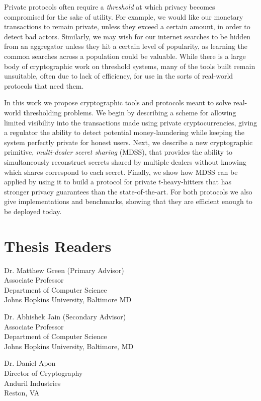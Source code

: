 
Private protocols often require a \emph{threshold} at which privacy becomes compromised for the sake of utility.
For example, we would like our monetary transactions to remain private, unless they exceed a certain amount, in order to detect bad actors.
Similarly, we may wish for our internet searches to be hidden from an aggregator unless they hit a certain level of popularity, as learning the common searches across a population could be valuable.
While there is a large body of cryptographic work on threshold systems, many of the tools built remain unsuitable, often due to lack of efficiency, for use in the sorts of real-world protocols that need them.

In this work we propose cryptographic tools and protocols meant to solve real-world thresholding problems.
We begin by describing a scheme for allowing limited visibility into the transactions made using private cryptocurrencies, giving a regulator the ability to detect potential money-laundering while keeping the system perfectly private for honest users.
Next, we describe a new cryptographic primitive, \emph{multi-dealer secret sharing} (MDSS), that provides the ability to simultaneously reconstruct secrets shared by multiple dealers without knowing which shares correspond to each secret.
Finally, we show how MDSS can be applied by using it to build a protocol for private $t$-heavy-hitters that has stronger privacy guarantees than the state-of-the-art.
For both protocols we also give implementations and benchmarks, showing that they are efficient enough to be deployed today.



\section*{Thesis Readers}

\begin{singlespace}

	Dr. Matthew Green (Primary Advisor)\\
	Associate Professor\\
	Department of Computer Science\\
	Johns Hopkins University, Baltimore MD

	\vspace{0.1in}

	Dr. Abhishek Jain (Secondary Advisor)\\
	Associate Professor\\
	Department of Computer Science \\
	Johns Hopkins University, Baltimore, MD

	\vspace{0.1in}

	Dr. Daniel Apon\\
	Director of Cryptography\\
	Anduril Industries\\
	Reston, VA


\end{singlespace}
